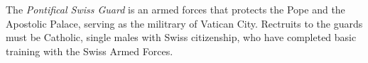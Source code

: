 The \emph{Pontifical Swiss Guard} is an armed forces that protects the Pope and the Apostolic Palace, serving as the militrary of Vatican City.
Rectruits to the guards must be Catholic, single males with Swiss citizenship, who have completed basic training with the Swiss Armed Forces.
